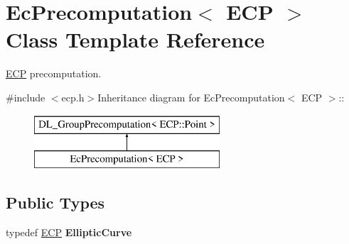 \hypertarget{class_ec_precomputation_3_01_e_c_p_01_4}{
\section{EcPrecomputation$<$ ECP $>$ Class Template Reference}
\label{class_ec_precomputation_3_01_e_c_p_01_4}
}


\hyperlink{class_e_c_p}{ECP} precomputation.  


{\ttfamily \#include $<$ecp.h$>$}Inheritance diagram for EcPrecomputation$<$ ECP $>$::\begin{figure}[H]
\begin{center}
\leavevmode
\includegraphics[height=2cm]{class_ec_precomputation_3_01_e_c_p_01_4}
\end{center}
\end{figure}
\subsection*{Public Types}
\begin{DoxyCompactItemize}
\item 
\hypertarget{class_ec_precomputation_3_01_e_c_p_01_4_a9d3922397513fa11f1d4073d28744f54}{
typedef \hyperlink{class_e_c_p}{ECP} {\bfseries EllipticCurve}}
\label{class_ec_precomputation_3_01_e_c_p_01_4_a9d3922397513fa11f1d4073d28744f54}

\end{DoxyCompactItemize}
